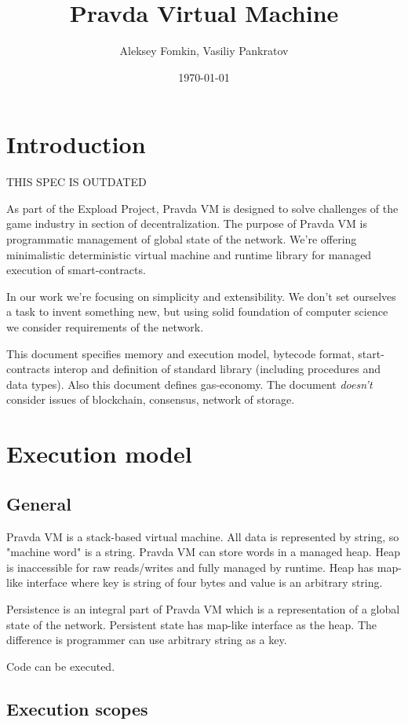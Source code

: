 \documentclass[12pt,a4paper]{article}
\title{Pravda Virtual Machine}
\author{Aleksey Fomkin, Vasiliy Pankratov}
\date{\today}
\begin{document}
\maketitle

\section{Introduction}

THIS SPEC IS OUTDATED

As part of the Expload Project, Pravda VM is designed to solve challenges of the game industry in section of decentralization. The purpose of Pravda VM is programmatic management of global state of the network. We're offering minimalistic deterministic virtual machine and runtime library for managed execution of smart-contracts.

In our work we're focusing on simplicity and extensibility. We don't set ourselves a task to invent something new, but using solid foundation of computer science we consider requirements of the network.

This document specifies memory and execution model, bytecode format, start-contracts interop and definition of standard library (including procedures and data types). Also this document defines gas-economy. The document \textit{doesn't} consider issues of blockchain, consensus, network of storage. 

\section{Execution model}

\subsection{General}

Pravda VM is a stack-based virtual machine. All data is represented by string, so "machine word" is a string. Pravda VM can store words in a managed heap. Heap is inaccessible for raw reads/writes and fully managed by runtime. Heap has map-like interface where key is string of four bytes and value is an arbitrary string. 

Persistence is an integral part of Pravda VM which is a representation of a global state of the network. Persistent state has map-like interface as the heap. The difference is programmer can use arbitrary string as a key.

Code can be executed.
\subsection{Execution scopes}
\end{document}
